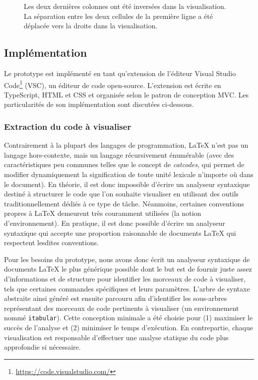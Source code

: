 \begin{figure}[h]
{   Les deux dernières colonnes ont été inversées dans la visualisation.
   La séparation entre les deux cellules de la première ligne a été déplacée vers la droite dans la visualisation.}
  \label{fig:ilatex-visualisations}
\end{figure}



\subsection{Implémentation}
Le prototype est implémenté en tant qu'extension de l'éditeur Visual Studio Code\footnote{\url{https://code.visualstudio.com/}} (VSC), un éditeur de code open-source.
L'extension est écrite en TypeScript, HTML et CSS et organisée selon le patron de conception MVC.
Les particularités de son implémentation sont discutées ci-dessous.


\subsubsection{Extraction du code à visualiser}
Contrairement à la plupart des langages de programmation, \LaTeX{} n'est pas un langage hors-contexte, mais un langage récursivement énumérable (avec des caractéristiques peu communes telles que le concept de \emph{catcodes}, qui permet de modifier dynamiquement la signification de toute unité lexicale n'importe où dans le document).
En théorie, il est donc impossible d'écrire un analyseur syntaxique destiné à structurer le code que l'on souhaite visualiser en utilisant des outils traditionnellement dédiés à ce type de tâche.
Néanmoins, certaines conventions propres à \LaTeX{} demeurent très couramment utilisées (\eg la notion d'environnement).
En pratique, il est donc possible d'écrire un analyseur syntaxique qui accepte une proportion raisonnable de documents \LaTeX{} qui respectent lesdites conventions.

Pour les besoins du prototype, nous avons donc écrit un analyseur syntaxique de documents \LaTeX{} le plus générique possible dont le but est de fournir juste assez d'informations et de structure pour identifier les morceaux de code à visualiser, tels que certaines commandes spécifiques et leurs paramètres.
L'arbre de syntaxe abstraite ainsi généré est ensuite parcouru afin d'identifier les sous-arbres représentant des morceaux de code pertinents à visualiser (\eg un environnement nommé \texttt{itabular}).
Cette conception minimale a été choisie pour (1) maximiser le succès de l'analyse et (2) minimiser le temps d'exécution.
En contrepartie, chaque visualisation est responsable d'effectuer une analyse statique du code plus approfondie si nécessaire.


